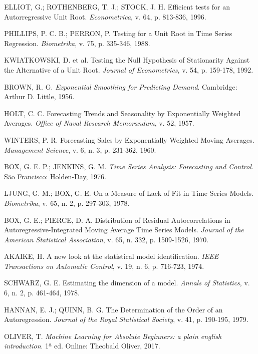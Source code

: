 \documentclass[twocolumn]{rbef}
\newcommand{\1}{\mathbbm{1}}
\begin{document}
\begin{thebibliography}{99}
 ELLIOT, G.; ROTHENBERG, T. J.; STOCK, J. H. Efficient tests for an Autorregressive Unit Root. \textit{Econometrica}, v. 64, p. 813-836, 1996.

 PHILLIPS, P. C. B.; PERRON, P. Testing for a Unit Root in Time Series Regression. \textit{Biometrika}, v. 75, p. 335-346, 1988.

 KWIATKOWSKI, D. et al. Testing the Null Hypothesis of Stationarity Against the Alternative of a Unit Root. \textit{Journal of Econometrics}, v. 54, p. 159-178, 1992.

 BROWN, R. G. \textit{Exponential Smoothing for Predicting Demand}. Cambridge: Arthur D. Little, 1956.

 HOLT, C. C. Forecasting Trends and Seasonality by Exponentially Weighted Averages. \textit{Office of Naval Research Memorandum}, v. 52, 1957.

 WINTERS, P. R. Forecasting Sales by Exponentially Weighted Moving Averages. \textit{Management Science}, v. 6, n. 3, p. 231-362, 1960.

 BOX, G. E. P.; JENKINS, G. M. \textit{Time Series Analysis: Forecasting and Control}. São Francisco: Holden-Day, 1976.

 LJUNG, G. M.; BOX, G. E. On a Measure of Lack of Fit in Time Series Models. \textit{Biometrika}, v. 65, n. 2, p. 297-303, 1978.

 BOX, G. E.; PIERCE, D. A. Distribution of Residual Autocorrelations in Autoregressive-Integrated Moving Average Time Series Models. \textit{Journal of the American Statistical Association}, v. 65, n. 332, p. 1509-1526, 1970.

 AKAIKE, H. A new look at the statistical model identification. \textit{IEEE Transactions on Automatic Control}, v. 19, n. 6, p. 716-723, 1974.

 SCHWARZ, G. E. Estimating the dimension of a model. \textit{Annals of Statistics}, v. 6, n. 2, p. 461-464, 1978.

 HANNAN, E. J.; QUINN, B. G. The Determination of the Order of an Autoregression. \textit{Journal of the Royal Statistical Society}, v. 41, p. 190-195, 1979.

 OLIVER, T. \textit{Machine Learning for Absolute Beginners: a plain english introduction}. 1ª ed. Online: Theobald Oliver, 2017.


\end{thebibliography}
\end{document}
